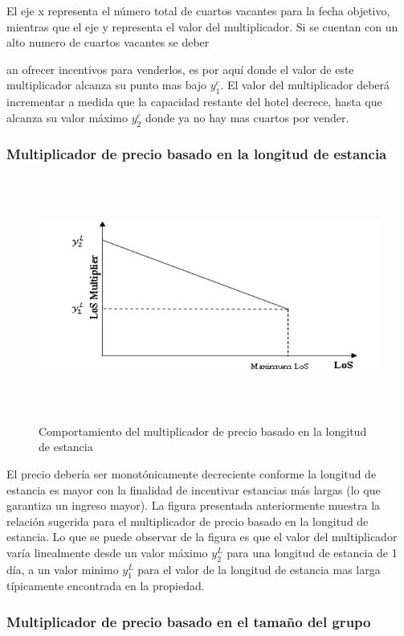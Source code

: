 {{El eje x representa el número total de cuartos vacantes para la fecha objetivo, mientras que el eje y representa el valor del multiplicador. Si se cuentan con un alto numero de cuartos vacantes se deber{an ofrecer incentivos para venderlos, es por aquí donde el valor de este multiplicador alcanza su punto mas bajo $y_1^c$. El valor del multiplicador deberá incrementar a medida que la capacidad restante del hotel decrece, hasta que alcanza su valor máximo $y_2^c$ donde ya no hay mas cuartos por vender.

\subsubsection*{Multiplicador de precio basado en la longitud de estancia}

\begin{figure}[H]
  \centering
      \includegraphics[width=\maxwidth,height=8cm]{figures/Los_Mult.png} 
  \caption{Comportamiento del multiplicador de precio basado en la longitud de estancia}
\end{figure}

El precio debería ser monotónicamente decreciente conforme la longitud de estancia es mayor con la finalidad de incentivar estancias más largas (lo que garantiza un ingreso mayor). La figura presentada anteriormente muestra la relación sugerida para el multiplicador de precio basado en la longitud de estancia. Lo que se puede observar de la figura es que el valor del multiplicador varía linealmente desde un valor máximo $y_2^L$ para una longitud de estancia de 1 día, a un valor minimo $y_1^L$ para el valor de la longitud de estancia mas larga típicamente encontrada en la propiedad.

\subsubsection*{Multiplicador de precio basado en el tamaño del grupo}

}}}
